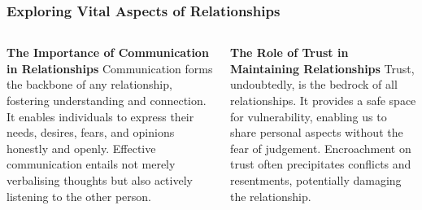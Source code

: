 \documentclass[5pt]{beamer}
\begin{document}
\begin{frame}
\frametitle{Exploring Vital Aspects of Relationships}
\begin{columns}
\begin{column}{0.45\textwidth}
\begin{block}{\textbf{The Importance of Communication in Relationships}}
Communication forms the backbone of any relationship, fostering understanding and connection. It enables individuals to express their needs, desires, fears, and opinions honestly and openly. Effective communication entails not merely verbalising thoughts but also actively listening to the other person.
\end{block}
\end{column}
\begin{column}{0.45\textwidth}
\begin{block}{\textbf{The Role of Trust in Maintaining Relationships}}
Trust, undoubtedly, is the bedrock of all relationships. It provides a safe space for vulnerability, enabling us to share personal aspects without the fear of judgement. Encroachment on trust often precipitates conflicts and resentments, potentially damaging the relationship.
\end{block}
\end{column}
\end{columns}
\end{frame}
\end{document}
